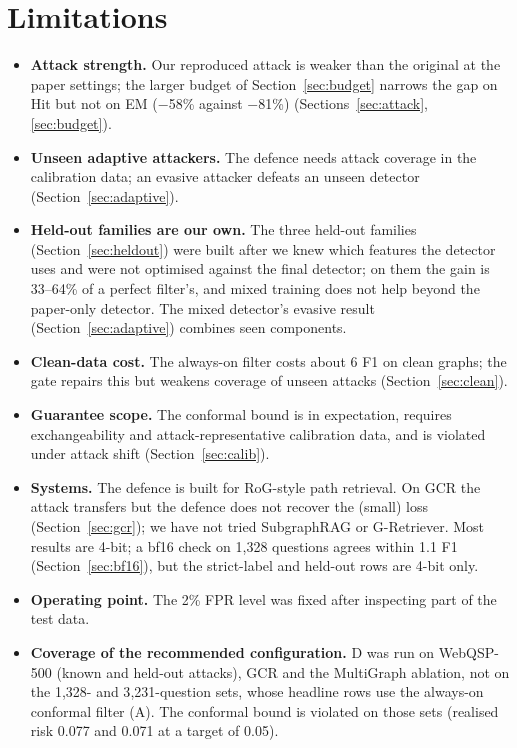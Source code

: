 \documentclass[preprint,12pt]{elsarticle}
\begin{document}
\section{Limitations}
\begin{itemize}[leftmargin=*,itemsep=2pt]
\item \textbf{Attack strength.} Our reproduced attack is weaker than the original at the paper settings; the larger budget of Section~\ref{sec:budget} narrows the gap on Hit but not on EM ($-$58\% against $-$81\%) (Sections~\ref{sec:attack}, \ref{sec:budget}).
\item \textbf{Unseen adaptive attackers.} The defence needs attack coverage in the calibration data; an evasive attacker defeats an unseen detector (Section~\ref{sec:adaptive}).
\item \textbf{Held-out families are our own.} The three held-out families (Section~\ref{sec:heldout}) were built after we knew which features the detector uses and were not optimised against the final detector; on them the gain is 33--64\% of a perfect filter's, and mixed training does not help beyond the paper-only detector. The mixed detector's evasive result (Section~\ref{sec:adaptive}) combines seen components.
\item \textbf{Clean-data cost.} The always-on filter costs about 6 F1 on clean graphs; the gate repairs this but weakens coverage of unseen attacks (Section~\ref{sec:clean}).
\item \textbf{Guarantee scope.} The conformal bound is in expectation, requires exchangeability and attack-representative calibration data, and is violated under attack shift (Section~\ref{sec:calib}).
\item \textbf{Systems.} The defence is built for RoG-style path retrieval. On GCR the attack transfers but the defence does not recover the (small) loss (Section~\ref{sec:gcr}); we have not tried SubgraphRAG or G-Retriever. Most results are 4-bit; a bf16 check on 1,328 questions agrees within 1.1 F1 (Section~\ref{sec:bf16}), but the strict-label and held-out rows are 4-bit only.
\item \textbf{Operating point.} The 2\% FPR level was fixed after inspecting part of the test data.
\item \textbf{Coverage of the recommended configuration.} D was run on WebQSP-500 (known and held-out attacks), GCR and the MultiGraph ablation, not on the 1{,}328- and 3{,}231-question sets, whose headline rows use the always-on conformal filter (A). The conformal bound is violated on those sets (realised risk 0.077 and 0.071 at a target of 0.05).

\end{itemize}
\end{document}
